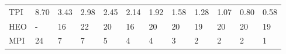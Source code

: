 \begin{table*}
{\begin{tabular}{llllllllllll}
TPI      &             8.70 &               3.43 &               2.98 &               2.45 &             2.14 &             1.92 &             1.58 &             1.28 &             1.07 &            0.80 &             0.58 \\
HEO      &                - &                 16 &                 22 &                 20 &               16 &               20 &               20 &               19 &               20 &              20 &               19 \\
MPI      &               24 &                  7 &                  7 &                  5 &                4 &                4 &                3 &                2 &                2 &               2 &                1 \\
\bottomrule
\end{tabular}}
\end{table*}
